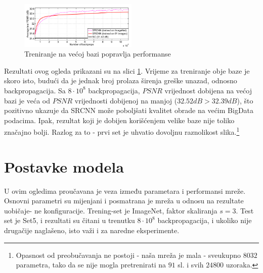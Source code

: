 \documentclass[12pt]{report}
\numberwithin{equation}{section}
\begin{document}
    \begin{figure} 
  \begin{center}
    \includegraphics[width=0.5\textwidth]{SLIKE/figure4}
  \end{center}
  \caption{Treniranje na većoj bazi popravlja performanse}
  \label{fig:ogled4}
\end{figure}
Rezultati ovog ogleda prikazani su na slici \ref{fig:ogled4}. Vrijeme za treniranje obje baze je skoro isto, budući da je jednak broj prolaza širenja greške unazad, odnosno backpropagacija. Sa $8 \cdot 10^8$ backpropagacija, $PSNR$ vrijednost dobijena na većoj bazi je veća od $PSNR$ vrijednosti dobijenoj na manjoj ($32.52 \textit{dB} > 32.39 \textit{dB}$), što pozitivno ukazuje da SRCNN može poboljšati kvalitet obrade na većim BigData podacima. Ipak, rezultat koji je dobijen korišćenjem velike baze nije toliko značajno bolji. Razlog za to - prvi set je uhvatio dovoljnu raznolikost slika.\footnote{Opasnost od preobučavanja ne postoji - naša mreža je mala - sveukupno $8 032$ parametra, tako da se nije mogla pretrenirati na $91$ sl. i svih $24 800$ uzoraka.} 
    
  

     
  
 
  \section{Postavke modela}
   
   U ovim ogledima proučavana je veza između parametara i performansi mreže. Osnovni parametri su mijenjani i posmatrana je mreža u odnosu na rezultate uobičaje-
ne konfiguracije. Trening-set je ImageNet, faktor skaliranja $s=3$. Test set je Set5, i rezultati su čitani u trenutku $8 \cdot 10^8$ backpropagacija, i ukoliko nije drugačije naglašeno, isto važi i za naredne eksperimente.

\end{document}
